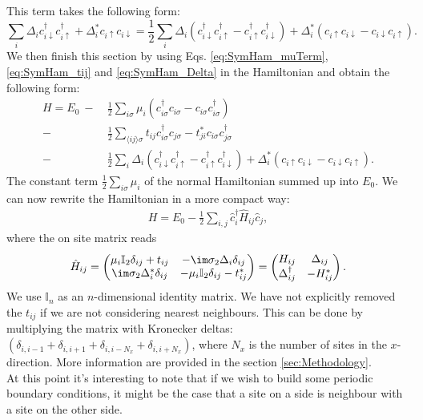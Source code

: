 \documentclass[../main.tex]{subfile}
\begin{document}
This term takes the following form:
\begin{equation}\label{eq:SymHam_Delta}
\sum_{i} \Delta_i c_{i\downarrow}^{\dagger}c_{i\uparrow}^{\dagger} + \Delta_i^{\ast} c_{i\uparrow}c_{i\downarrow}
        = \frac{1}{2}\sum_{i} \Delta_i \left(c_{i\downarrow}^{\dagger}c_{i\uparrow}^{\dagger}-c_{i\uparrow}^{\dagger}c_{i\downarrow}^{\dagger}\right)+ \Delta_i^{\ast} \left(c_{i\uparrow}c_{i\downarrow}-c_{i\downarrow}c_{i\uparrow}\right).
\end{equation}
We then finish this section by using Eqs. \ref{eq:SymHam_muTerm}, \ref{eq:SymHam_tij} and \ref{eq:SymHam_Delta} in the Hamiltonian and obtain the following form:
\begin{equation}\label{eq:Ham_Symm_Supercond_1}
    \begin{aligned}
    H = E_0 ~-~& \frac{1}{2} \sum_{i\sigma} \mu_i\left(c_{i\sigma}^{\dagger}c_{i\sigma} - c_{i\sigma}c_{i\sigma}^{\dagger}\right)\\
    -& \frac{1}{2}\sum_{\langle ij\rangle \sigma} t_{ij}c_{i\sigma}^{\dagger}c_{j\sigma} - t_{ji}^{\ast}c_{i\sigma}c_{j\sigma}^{\dagger}\\
    -& \frac{1}{2}\sum_{i} \Delta_i \left(c_{i\downarrow}^{\dagger}c_{i\uparrow}^{\dagger}-c_{i\uparrow}^{\dagger}c_{i\downarrow}^{\dagger}\right) +
    \Delta_i^{\ast} \left(c_{i\uparrow}c_{i\downarrow}-c_{i\downarrow}c_{i\uparrow}\right).
    \end{aligned}
\end{equation}
The constant term $\frac{1}{2} \sum_{i\sigma} \mu_i$ of the normal Hamiltonian summed up into $E_0$.
We can now rewrite the Hamiltonian in a more compact way:
\begin{align}
    H = E_0 - \frac{1}{2}\sum_{i,j} \hat{c}_i^{\dagger} \hat{H}_{ij} \hat{c}_j  \label{eq:BdG_sys_H},
\end{align}
where the on site matrix reads
\begin{align}
    \hat{H}_{ij} = \begin{pmatrix}
        \mu_i \mathbb{I}_2 \delta_{ij} + t_{ij} & -\im\sigma_2\Delta_i \delta_{ij}\\
        \im\sigma_2\Delta^{\ast}_i \delta_{ij} & -\mu_i \mathbb{I}_2 \delta_{ij} - t_{ij}^{\ast}
    \end{pmatrix} = \begin{pmatrix}
        H_{ij} & \Delta_{ij}\\
        \Delta_{ij}^{\dagger} & -H_{ij}^{\ast}
    \end{pmatrix}.    \label{eq:H^_ij} 
\end{align}
We use $\mathbb{I}_n$ as an $n$-dimensional identity matrix. We have not explicitly removed the 
$t_{ij}$ if we are not considering nearest neighbours. This can be done by multiplying the matrix with Kronecker deltas: 
$(\delta_{i,i-1}+ \delta_{i,i+1}+\delta_{i,i-N_x}+\delta_{i,i+N_x})$, where $N_x$ is the number of sites in the $x$-direction. More information
are provided in the section \ref{sec:Methodology}.\\
At this point it's interesting to note that if we wish to build some periodic boundary conditions, 
it might be the case that a site on a side is neighbour with a site on the other side.\\  
\end{document}
